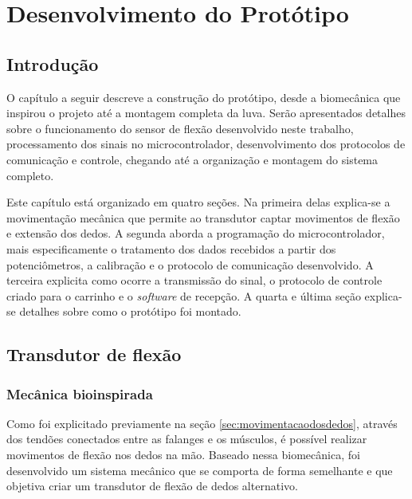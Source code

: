 \documentclass[
	12pt,				%
	openright,			%
	oneside,			%
	a4paper,			%
	english,			%
	brazil				%
	]{abntex2}
\begin{document}
%
%
	
	\chapter{Desenvolvimento do Protótipo}

		\section{Introdução}
		
		O capítulo a seguir descreve a construção do protótipo, desde a biomecânica que inspirou o projeto até a montagem completa da luva. Serão apresentados detalhes sobre o funcionamento do sensor de flexão desenvolvido neste trabalho, processamento dos sinais no microcontrolador, desenvolvimento dos protocolos de comunicação e controle, chegando até a organização e montagem do sistema completo.
		
		Este capítulo está organizado em quatro seções. Na primeira delas explica-se a movimentação mecânica que permite ao transdutor captar movimentos de flexão e extensão dos dedos. A segunda aborda a programação do microcontrolador, mais especificamente o tratamento dos dados recebidos a partir dos potenciômetros, a calibração e o protocolo de comunicação desenvolvido. A terceira explicita como ocorre a transmissão do sinal, o protocolo de controle criado para o carrinho e o \textit{software} de recepção. A quarta e última seção explica-se detalhes sobre como o protótipo foi montado.



		\section{Transdutor de flexão}

			\subsection{Mecânica bioinspirada}

		Como foi explicitado previamente na seção \ref{sec:movimentacaodosdedos}, através dos tendões conectados entre as falanges e os músculos, é possível realizar movimentos de flexão nos dedos na mão. Baseado nessa biomecânica, foi desenvolvido um sistema mecânico que se comporta de forma semelhante e que objetiva criar um transdutor de flexão de dedos alternativo. 
\end{document}
